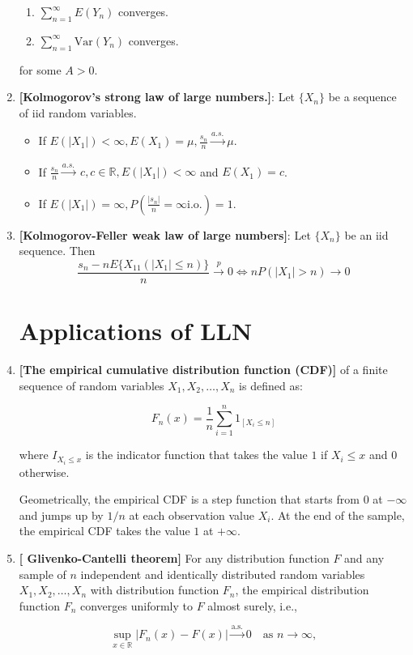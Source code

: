 \documentclass[12pt,oneside]{book}
\begin{document}
\begin{enumerate}
\begin{enumerate}
    \item $\sum_{n=1}^\infty E(Y_n)$ converges.
    \item $\sum_{n=1}^\infty \text{Var}(Y_n)$ converges.
\end{enumerate}
for some $A>0$.
\item \textbf{[Kolmogorov's strong law of large numbers.]}: Let $\{X_n\}$ be a sequence of iid random variables.
\begin{itemize}
    \item If $E(|X_1|)<\infty, E(X_1)=\mu, \frac{s_n}{n}\xrightarrow[]{a.s.}\mu$.
    \item If $\frac{s_n}{n}\xrightarrow[]{a.s.}\ c, c\in\mathbb{R}, E(|X_1|)<\infty$ and $E(X_1)=c$.
    \item If $E(|X_1|)=\infty, P(\frac{|s_n|}{n}=\infty \text{i.o.})=1$.
\end{itemize}
\item \textbf{[Kolmogorov-Feller weak law of large numbers]}:  Let $\{X_n\}$ be an iid sequence. Then
\[
\frac{s_n-nE\{X_11(|X_1|\leq n)\}}{n} \xrightarrow[]{p}0 \iff nP(|X_1|>n)\rightarrow 0
\]

\section{Applications of LLN}

\item \textbf{[The empirical cumulative distribution function (CDF)]}  of a finite sequence of random variables $X_1, X_2, \ldots, X_n$ is defined as:

$$F_n(x)=\frac{1}{n}\sum_{i=1}^n1_{[X_i\leq n]}$$

where $I_{{X_i \leq x}}$ is the indicator function that takes the value $1$ if $X_i \leq x$ and $0$ otherwise.

Geometrically, the empirical CDF is a step function that starts from $0$ at $-\infty$ and jumps up by $1/n$ at each observation value $X_i$. At the end of the sample, the empirical CDF takes the value $1$ at $+\infty$.

\item \textbf{[ Glivenko-Cantelli theorem]} For any distribution function $F$ and any sample of $n$ independent and identically distributed random variables $X_1, X_2, \dots, X_n$ with distribution function $F_n$, the empirical distribution function $F_n$ converges uniformly to $F$ almost surely, i.e.,

\begin{equation*}
\sup_{x\in\mathbb{R}}\left|F_n(x) - F(x)\right| \overset{\text{a.s.}}{\longrightarrow} 0 \quad \text{as } n \rightarrow \infty,
\end{equation*}


\end{enumerate}
\end{document}
